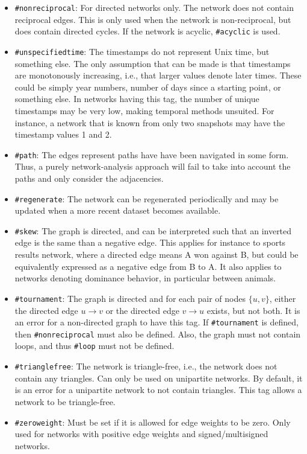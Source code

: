 \documentclass{article}
\begin{document}
\begin{itemize}
  which one cites the other.  In such a case, the network in
  KONECT is undirected, although the underlying network is
  actually directed.
\item \texttt{\#nonreciprocal}:  For directed networks only.
  The network does not contain reciprocal edges.  This is only
  used when the network is non-reciprocal, but does contain
  directed cycles.  If the network is acyclic,
  \texttt{\#acyclic} is used. 
\item \texttt{\#unspecifiedtime}:  The timestamps do not represent Unix
  time, but something else.  The only assumption that can be made is
  that timestamps are monotonously increasing, i.e., that larger values
  denote later times.  These could be simply year numbers, number of
  days since a starting point, or something else.  In networks having
  this tag, the number of unique timestamps may be very low, making
  temporal methods unsuited.  For instance, a network that is known from
  only two snapshots may have the timestamp values 1 and 2. 
\item \texttt{\#path}:  The edges represent paths have have been
  navigated in some form.  Thus, a purely network-analysis approach will
  fail to take into account the paths and only consider the
  adjacencies. 
\item \texttt{\#regenerate}: The network can be regenerated
  periodically and may be updated when a more recent dataset
  becomes available.
\item \texttt{\#skew}:  The graph is directed,
  and can be interpreted such that an inverted edge is the same than a
  negative edge.  This applies for instance to sports results network,
  where a directed edge means A won against B, but could be equivalently
  expressed as a negative edge from B to A.  It also applies to networks
  denoting dominance behavior, in particular between animals. 
\item \texttt{\#tournament}:  The graph is directed and for each
  pair of nodes $\{u,v\}$, either the directed edge $u \rightarrow v$ or
  the directed edge $v \rightarrow u$ exists, but not both.  It
  is an error for a non-directed graph to have this tag.  If
  \texttt{\#tournament} is defined, then
  \texttt{\#nonreciprocal} must also be defined.  Also, the graph must
  not contain loops, and thus
  \texttt{\#loop} must not be defined. 
\item \texttt{\#trianglefree}:  The network is triangle-free, i.e., the
  network does not contain any triangles.  Can only be used on
  unipartite networks.  By default, it is an error for a unipartite
  network to not contain triangles.  This tag allows a network to be
  triangle-free. 
\item \texttt{\#zeroweight}:  Must be set if it is allowed for edge
  weights to be zero. Only used for networks with positive edge
  weights and signed/multisigned networks. 
\end{itemize}
\end{document}
